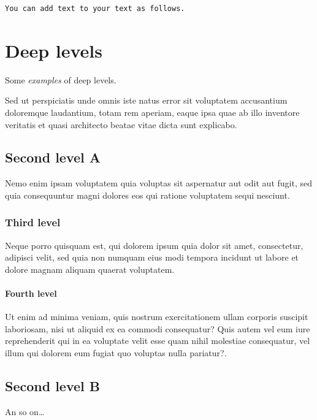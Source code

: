\documentclass[
  english,
  a4paper,
  openany]{book}
\begin{document}
\begin{verbatim}
You can add text to your text as follows.
\end{verbatim}

\hypertarget{levels}{%
\chapter{Deep levels}\label{levels}}

Some \emph{examples} of deep levels.

Sed ut perspiciatis unde omnis iste natus error sit voluptatem accusantium doloremque laudantium, totam rem aperiam, eaque ipsa quae ab illo inventore veritatis et quasi architecto beatae vitae dicta sunt explicabo.

\hypertarget{second-level-a}{%
\section{Second level A}\label{second-level-a}}

Nemo enim ipsam voluptatem quia voluptas sit aspernatur aut odit aut fugit, sed quia consequuntur magni dolores eos qui ratione voluptatem sequi nesciunt.

\hypertarget{third-level}{%
\subsection{Third level}\label{third-level}}

Neque porro quisquam est, qui dolorem ipsum quia dolor sit amet, consectetur, adipisci velit, sed quia non numquam eius modi tempora incidunt ut labore et dolore magnam aliquam quaerat voluptatem.

\hypertarget{fourth-level}{%
\subsubsection{Fourth level}\label{fourth-level}}

Ut enim ad minima veniam, quis nostrum exercitationem ullam corporis suscipit laboriosam, nisi ut aliquid ex ea commodi consequatur? Quis autem vel eum iure reprehenderit qui in ea voluptate velit esse quam nihil molestiae consequatur, vel illum qui dolorem eum fugiat quo voluptas nulla pariatur?.

\hypertarget{second-level-b}{%
\section{Second level B}\label{second-level-b}}

An so on\ldots{}

  
\end{document}
